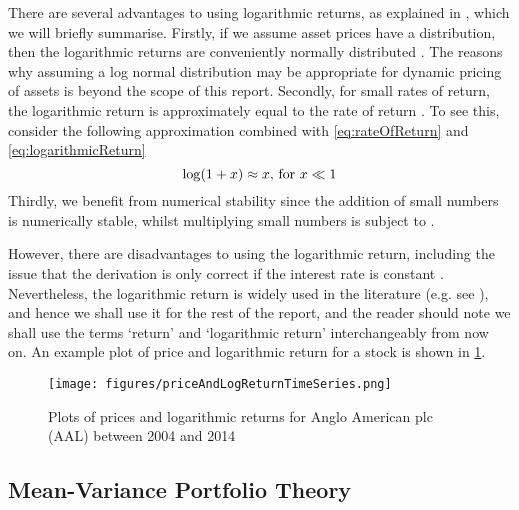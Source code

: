 There are several advantages to using logarithmic returns, as explained in \cite{QuaWp}, which we will briefly summarise.
Firstly, if we assume asset prices have a  distribution, then the logarithmic returns are conveniently normally distributed \cite{QuaWp}. The reasons why assuming a log normal distribution may be appropriate for dynamic pricing of assets is beyond the scope of this report.
Secondly, for small rates of return, the logarithmic return is approximately equal to the rate of return \cite{QuaWp}. To see this, consider the following approximation combined with \cref{eq:rateOfReturn} and \cref{eq:logarithmicReturn}
\begin{equation}
	\label{eq:logarithApproximation}
	\log(1 + x) \approx x \text{, for } x \ll 1
\end{equation}
Thirdly, we benefit from numerical stability since the addition of small numbers is numerically stable, whilst multiplying small numbers is subject to  \cite{QuaWp}.

However, there are disadvantages to using the logarithmic return, including the issue that the derivation is only correct if the interest rate is constant \cite{QuaWp,Onn02}.
Nevertheless, the logarithmic return is widely used in the literature (e.g. see \cite{Onn02,OCK+02,OKK03,FPM+10,FPW+11,MG13}), and hence we shall use it for the rest of the report, and the reader should note we shall use the terms `return' and `logarithmic return' interchangeably from now on. An example plot of price and logarithmic return for a stock is shown in \cref{fig:priceAndLogReturn}.

\begin{figure}
	\centering
	\texttt{[image: figures/priceAndLogReturnTimeSeries.png]}
	\caption[Example plot for price and logarithmic return]{\label{fig:priceAndLogReturn} Plots of prices and logarithmic returns for Anglo American plc (AAL) between 2004 and 2014}
\end{figure}


\subsection{Mean-Variance Portfolio Theory}
\label{subsec:portfolioTheoryBackground}


